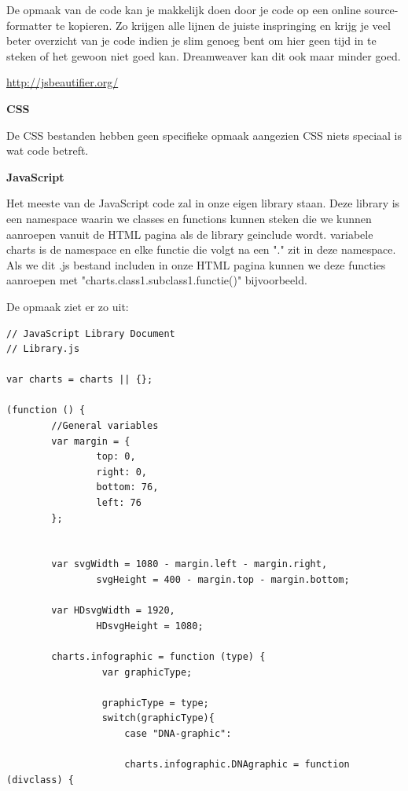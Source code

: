 De opmaak van de code kan je makkelijk doen door je code op een online source-formatter te kopieren. Zo krijgen alle lijnen de juiste inspringing en krijg je veel beter overzicht van je code indien je slim genoeg bent om hier geen tijd in te steken of het gewoon niet goed kan. Dreamweaver kan dit ook maar minder goed.

\url{http://jsbeautifier.org/}

\textbf{CSS}

De CSS bestanden hebben geen specifieke opmaak aangezien CSS niets speciaal is wat code betreft.

\textbf{JavaScript}

Het meeste van de JavaScript code zal in onze eigen library staan. Deze library is een namespace waarin we classes en functions kunnen steken die we kunnen aanroepen vanuit de HTML pagina als de library geinclude wordt. 
variabele charts is de namespace en elke functie die volgt na een "." zit in deze namespace. Als we dit .js bestand includen in onze HTML pagina kunnen we deze functies aanroepen met "charts.class1.subclass1.functie()" bijvoorbeeld.

De opmaak ziet er zo uit: 

\lstset{numbers=left, stepnumber=1, basicstyle=\footnotesize, frame=none, xleftmargin=.3in}
\begin{lstlisting}
// JavaScript Library Document
// Library.js

var charts = charts || {};

(function () {
        //General variables
        var margin = {
                top: 0,
                right: 0,
                bottom: 76,
                left: 76
        };


        var svgWidth = 1080 - margin.left - margin.right,
                svgHeight = 400 - margin.top - margin.bottom;

        var HDsvgWidth = 1920,
                HDsvgHeight = 1080;
                
        charts.infographic = function (type) {
                 var graphicType;
                 
                 graphicType = type;
                 switch(graphicType){
                     case "DNA-graphic":
                     
                     charts.infographic.DNAgraphic = function (divclass) {
                         
                           
\end{lstlisting}

